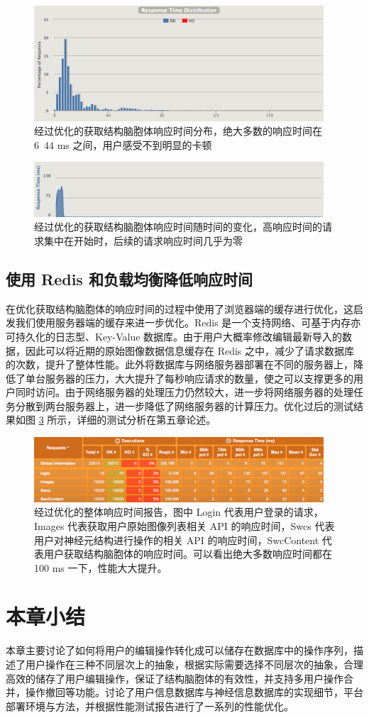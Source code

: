 \begin{figure}[!ht]
\centering
\includegraphics[width=108mm]{images/swcdic}
\caption{经过优化的获取结构脑胞体响应时间分布，绝大多数的响应时间在 6~44 ms 之间，用户感受不到明显的卡顿}
\label{swcdic}
\end{figure}

\begin{figure}[!ht]
\centering
\includegraphics[width=108mm]{images/res-time}
\caption{经过优化的获取结构脑胞体响应时间随时间的变化，高响应时间的请求集中在开始时，后续的请求响应时间几乎为零}
\label{res-time}
\end{figure}

\subsection{使用 Redis 和负载均衡降低响应时间}
在优化获取结构脑胞体的响应时间的过程中使用了浏览器端的缓存进行优化，这启发我们使用服务器端的缓存来进一步优化。Redis 是一个支持网络、可基于内存亦可持久化的日志型、Key-Value 数据库。由于用户大概率修改编辑最新导入的数据，因此可以将近期的原始图像数据信息缓存在 Redis 之中，减少了请求数据库的次数，提升了整体性能。此外将数据库与网络服务器部署在不同的服务器上，降低了单台服务器的压力，大大提升了每秒响应请求的数量，使之可以支撑更多的用户同时访问。由于网络服务器的处理压力仍然较大，进一步将网络服务器的处理任务分散到两台服务器上，进一步降低了网络服务器的计算压力。优化过后的测试结果如图 \ref{opt} 所示，详细的测试分析在第五章论述。

\begin{figure}[!ht]
\centering
\includegraphics[width=108mm]{images/opt}
\caption{经过优化的整体响应时间报告，图中 Login 代表用户登录的请求， Images 代表获取用户原始图像列表相关 API 的响应时间，Swcs 代表用户对神经元结构进行操作的相关 API 的响应时间，SwcContent 代表用户获取结构脑胞体的响应时间。可以看出绝大多数响应时间都在 100 ms 一下，性能大大提升。}
\label{opt}
\end{figure}

\section{本章小结}
本章主要讨论了如何将用户的编辑操作转化成可以储存在数据库中的操作序列，描述了用户操作在三种不同层次上的抽象，根据实际需要选择不同层次的抽象，合理高效的储存了用户编辑操作，保证了结构脑胞体的有效性，并支持多用户操作合并，操作撤回等功能。讨论了用户信息数据库与神经信息数据库的实现细节，平台部署环境与方法，并根据性能测试报告进行了一系列的性能优化。
